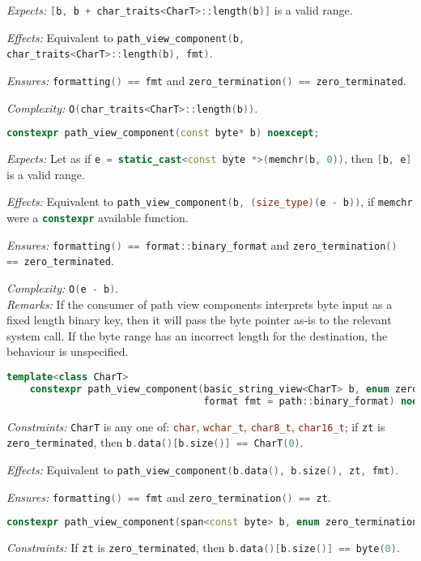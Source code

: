 \documentclass[11pt]{article}
\newcommand{\code}[2][cpp]{\lstinline[language=#1,basicstyle=\small\ttfamily]{#2}}
\newcommand{\desc}[1]{\textit{#1}}
\newcommand{\constraints}{\desc{Constraints: }}
\newcommand{\effects}{\desc{Effects: }}
\newcommand{\expects}{\desc{Expects: }}
\newcommand{\ensures}{\desc{Ensures: }}
\newcommand{\remarks}{\desc{Remarks: }}
\newcommand{\complexity}{\desc{Complexity: }}
\begin{document}
\expects \code{[b, b + char_traits<CharT>::length(b)]} is a valid range.

\effects Equivalent to \code{path_view_component(b, char_traits<CharT>::length(b), fmt)}.

\ensures \code{formatting() == fmt} and \code{zero_termination() == zero_terminated}.

\complexity \code{O(char_traits<CharT>::length(b))}.\\

\begin{lstlisting}[language=cpp]
    constexpr path_view_component(const byte* b) noexcept;
\end{lstlisting}

\expects Let as if \code{e = static_cast<const byte *>(memchr(b, 0))}, then \code{[b, e]} is a valid range.

\effects Equivalent to \code{path_view_component(b, (size_type)(e - b))}, if \code{memchr} were a \code{constexpr} available function.

\ensures \code{formatting() == format::binary_format} and \code{zero_termination() == zero_terminated}.

\complexity \code{O(e - b)}.\\

\remarks{If the consumer of path view components interprets byte input as a fixed length binary key, then it will pass the byte pointer as-is to the relevant system call. If the byte range has an incorrect length for the destination, the behaviour is unspecified.}

\begin{lstlisting}[language=cpp]
    template<class CharT>
    constexpr path_view_component(basic_string_view<CharT> b, enum zero_termination zt,
                                  format fmt = path::binary_format) noexcept;
\end{lstlisting}
\constraints \code{CharT} is any one of: \code{char}, \code{wchar_t}, \code{char8_t}, \code{char16_t}; if \code{zt} is \code{zero_terminated}, then \code{b.data()[b.size()] == CharT(0)}.

\effects Equivalent to \code{path_view_component(b.data(), b.size(), zt, fmt)}.

\ensures \code{formatting() == fmt} and \code{zero_termination() == zt}.\\

\begin{lstlisting}[language=cpp]
    constexpr path_view_component(span<const byte> b, enum zero_termination zt) noexcept;
\end{lstlisting}
\constraints If \code{zt} is \code{zero_terminated}, then \code{b.data()[b.size()] == byte(0)}.
\end{document}
